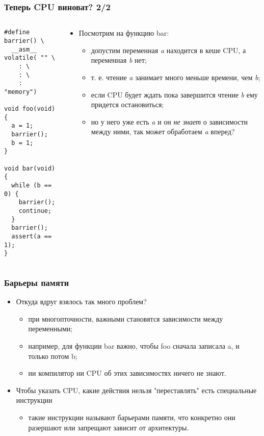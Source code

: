 \begin{frame}[fragile]
\frametitle{Теперь CPU виноват? 2/2}
\begin{columns}
  \begin{column}{0.3\linewidth}
    \begin{lstlisting}
#define barrier() \
  __asm__ volatile( "" \
	: \
	: \
	: "memory")

void foo(void)
{
  a = 1;
  barrier();
  b = 1;
}

void bar(void)
{
  while (b == 0) {
    barrier();
    continue;
  }
  barrier();
  assert(a == 1);
}
    \end{lstlisting}
  \end{column}
  \begin{column}{0.8\linewidth}
  \begin{itemize}
    \item Посмотрим на функцию bar:
    \begin{itemize}
      \item допустим переменная \emph{a} находится в кеше CPU, а переменная
      \emph{b} нет;
      \item т. е. чтение \emph{a} занимает много меньше времени, чем \emph{b};
      \item если CPU будет ждать пока завершится чтение \emph{b} ему придется
      остановиться;
      \item но у него уже есть \emph{a} и он \emph{не знает} о зависимости между
      ними, так может обработаем \emph{a} вперед?
    \end{itemize}
  \end{itemize}
  \end{column}
\end{columns}
\end{frame}

\begin{frame}
\frametitle{Барьеры памяти}
\begin{itemize}
  \item Откуда вдруг взялось так много проблем?
  \begin{itemize}
    \item при многопточности, важными становятся зависимости между переменными;
    \item например, для функции bar важно, чтобы foo сначала записала a, и
    только потом b;
    \item ни компилятор ни CPU об этих зависимостях ничего не знают.
  \end{itemize}
  \item Чтобы указать CPU, какие действия нельзя "переставлять" есть специальные
  инструкции
  \begin{itemize}
    \item такие инструкции называют барьерами памяти, что конкретно они
    разершают или запрещают зависит от архитектуры.
  \end{itemize}
\end{itemize}
\end{frame}

